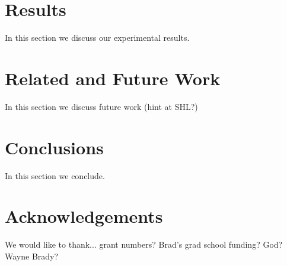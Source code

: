 \documentclass[letterpaper]{article}
\begin{document}
\section{Results}
\label{sec:result}
In this section we discuss our experimental results.

\section{Related and Future Work}
\label{sec:future}
In this section we discuss future work (hint at SHL?)

\section{Conclusions}
\label{sec:conclusions}
In this section we conclude.

\section{Acknowledgements}
\label{sec:acknowledgements}
We would like to thank... grant numbers?  Brad's grad school funding?  God?
Wayne Brady?



\end{document}

